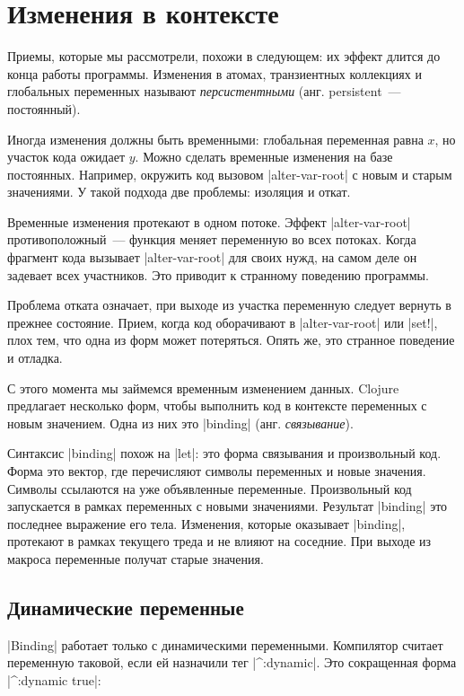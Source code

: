 \section{Изменения в контексте}

Приемы, которые мы рассмотрели, похожи в следующем: их эффект длится до конца
работы программы. Изменения в атомах, транзиентных коллекциях и глобальных
переменных называют \emph{персистентными} (анг. persistent~--- постоянный).

Иногда изменения должны быть временными: глобальная переменная равна $x$, но
участок кода ожидает $y$. Можно сделать временные изменения на базе
постоянных. Например, окружить код вызовом \spverb|alter-var-root| с новым и
старым значениями. У такой подхода две проблемы: изоляция и откат.

Временные изменения протекают в одном потоке. Эффект \spverb|alter-var-root|
противоположный~--- функция меняет переменную во всех потоках. Когда фрагмент
кода вызывает \spverb|alter-var-root| для своих нужд, на самом деле он задевает
всех участников. Это приводит к странному поведению программы.

Проблема отката означает, при выходе из участка переменную следует вернуть в
прежнее состояние. Прием, когда код оборачивают в \spverb|alter-var-root| или
\spverb|set!|, плох тем, что одна из форм может потеряться. Опять же, это
странное поведение и отладка.

С этого момента мы займемся временным изменением данных. Clojure предлагает
несколько форм, чтобы выполнить код в контексте переменных с новым
значением. Одна из них это \spverb|binding| (анг. \emph{связывание}).

Синтаксис \spverb|binding| похож на \spverb|let|: это форма связывания и
произвольный код. Форма это вектор, где перечисляют символы переменных и новые
значения. Символы ссылаются на уже объявленные переменные. Произвольный код
запускается в рамках переменных с новыми значениями. Результат \spverb|binding|
это последнее выражение его тела. Изменения, которые оказывает \spverb|binding|,
протекают в рамках текущего треда и не влияют на соседние. При выходе из макроса
переменные получат старые значения.

\subsection{Динамические переменные}

\spverb|Binding| работает только с динамическими переменными. Компилятор считает
переменную таковой, если ей назначили тег \spverb|^:dynamic|. Это сокращенная
форма \spverb|^{:dynamic true}|:

